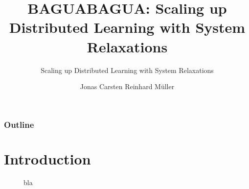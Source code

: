 \documentclass{beamer}
\title{BAGUA}
\subtitle{Scaling up Distributed Learning with System Relaxations}
\institute{}
\date{}
\author[Jonas]{Jonas Carsten Reinhard Müller}
\title[BAGUA]{BAGUA: Scaling up Distributed Learning with System Relaxations}
\begin{document}
\begin{frame}
\titlepage
\end{frame}



\begin{frame}
\frametitle{Outline}
\tableofcontents
\end{frame}


\section{Introduction}
\begin{frame}{}
\begin{figure}
\color{blue}\Huge{}bla
\end{figure}
\end{frame}




\end{document}
